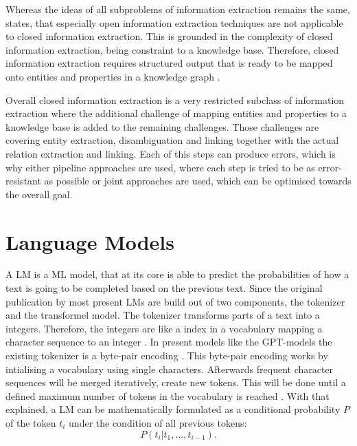 \documentclass[a4paper,oneside,bibliography=totoc]{scrbook}
\begin{document}
Whereas the ideas of all subproblems of information extraction remains the same, \citet{Josifoski2021} states, that especially open information extraction techniques are not applicable to closed information extraction. This is grounded in the complexity of closed information extraction, being constraint to a knowledge base. Therefore, closed information extraction requires structured output that is ready to be mapped onto entities and properties in a knowledge graph \cite{Josifoski2021}.

Overall closed information extraction is a very restricted subclass of information extraction where the additional challenge of mapping entities and properties to a knowledge base is added to the remaining challenges. Those challenges are covering entity extraction, disambiguation and linking together with the actual relation extraction and linking. Each of this steps can produce errors, which is why either pipeline approaches are used, where each step is tried to be as error-resistant as possible or joint approaches are used, which can be optimised towards the overall goal.

\section{Language Models}
\label{sec:language_models}
A \ac{LM} is a \ac{ML} model, that at its core is able to predict the probabilities of how a text is going to be completed based on the previous text\cite{Radford2019}. Since the original publication by \citet{Vaswani2023} most present \acp{LM} are build out of two components, the tokenizer and the transformel model. The tokenizer transforms parts of a text into a integers. Therefore, the integers are like a index in a vocabulary mapping a character sequence to an integer \cite{Sennrich2016}. In present models like the GPT-models the existing tokenizer is a byte-pair encoding \cite{Radford2019}. This byte-pair encoding works by intialising a vocabulary using single characters. Afterwards frequent character sequences will be merged iteratively, create new tokens. This will be done until a defined maximum number of tokens in the vocabulary is reached \cite{Sennrich2016}. With that explained, a \ac{LM} can be mathematically formulated as a conditional probability $P$ of the token $t_i$ under the condition of all previous tokens:
\begin{equation}
  P(t_i|t_1,...,t_{i-1}).
\end{equation}
\end{document}
